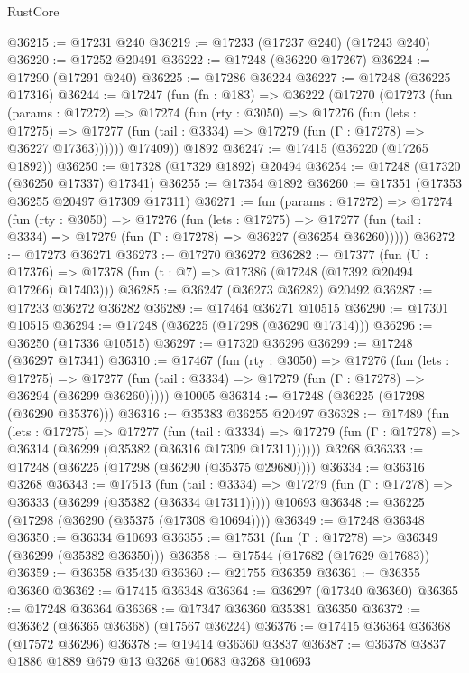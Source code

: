 \begin{lexlean}{RustCore}
\begin{coremodule}
@36215 := @17231 @240
@36219 := @17233 (@17237 @240) (@17243 @240)
@36220 := @17252 @20491
@36222 := @17248 (@36220 @17267)
@36224 := @17290 (@17291 @240)
@36225 := @17286 @36224
@36227 := @17248 (@36225 @17316)
@36244 := @17247
    (fun (fn : @183) =>
    @36222
      (@17270
        (@17273
          (fun (params : @17272) =>
          @17274
            (fun (rty : @3050) =>
            @17276
              (fun (lets : @17275) =>
              @17277 (fun (tail : @3334) => @17279 (fun (Γ : @17278) => @36227 @17363))))))
        @17409))
    @1892
@36247 := @17415 (@36220 (@17265 @1892))
@36250 := @17328 (@17329 @1892) @20494
@36254 := @17248 (@17320 (@36250 @17337) @17341)
@36255 := @17354 @1892
@36260 := @17351 (@17353 @36255 @20497 @17309 @17311)
@36271 := fun (params : @17272) =>
  @17274
    (fun (rty : @3050) =>
    @17276
      (fun (lets : @17275) =>
      @17277 (fun (tail : @3334) => @17279 (fun (Γ : @17278) => @36227 (@36254 @36260)))))
@36272 := @17273 @36271
@36273 := @17270 @36272
@36282 := @17377
    (fun (U : @17376) => @17378 (fun (t : @7) => @17386 (@17248 (@17392 @20494 @17266) @17403)))
@36285 := @36247 (@36273 @36282) @20492
@36287 := @17233 @36272 @36282
@36289 := @17464 @36271 @10515
@36290 := @17301 @10515
@36294 := @17248 (@36225 (@17298 (@36290 @17314)))
@36296 := @36250 (@17336 @10515)
@36297 := @17320 @36296
@36299 := @17248 (@36297 @17341)
@36310 := @17467
    (fun (rty : @3050) =>
    @17276
      (fun (lets : @17275) =>
      @17277 (fun (tail : @3334) => @17279 (fun (Γ : @17278) => @36294 (@36299 @36260)))))
    @10005
@36314 := @17248 (@36225 (@17298 (@36290 @35376)))
@36316 := @35383 @36255 @20497
@36328 := @17489
    (fun (lets : @17275) =>
    @17277
      (fun (tail : @3334) =>
      @17279 (fun (Γ : @17278) => @36314 (@36299 (@35382 (@36316 @17309 @17311))))))
    @3268
@36333 := @17248 (@36225 (@17298 (@36290 (@35375 @29680))))
@36334 := @36316 @3268
@36343 := @17513
    (fun (tail : @3334) => @17279 (fun (Γ : @17278) => @36333 (@36299 (@35382 (@36334 @17311)))))
    @10693
@36348 := @36225 (@17298 (@36290 (@35375 (@17308 @10694))))
@36349 := @17248 @36348
@36350 := @36334 @10693
@36355 := @17531 (fun (Γ : @17278) => @36349 (@36299 (@35382 @36350)))
@36358 := @17544 (@17682 (@17629 @17683))
@36359 := @36358 @35430
@36360 := @21755 @36359
@36361 := @36355 @36360
@36362 := @17415 @36348
@36364 := @36297 (@17340 @36360)
@36365 := @17248 @36364
@36368 := @17347 @36360 @35381 @36350
@36372 := @36362 (@36365 @36368) (@17567 @36224)
@36376 := @17415 @36364 @36368 (@17572 @36296)
@36378 := @19414 @36360 @3837
@36387 := @36378 @3837 @1886 @1889 @679 @13 @3268 @10683 @3268 @10693

\end{coremodule}
\end{lexlean}
